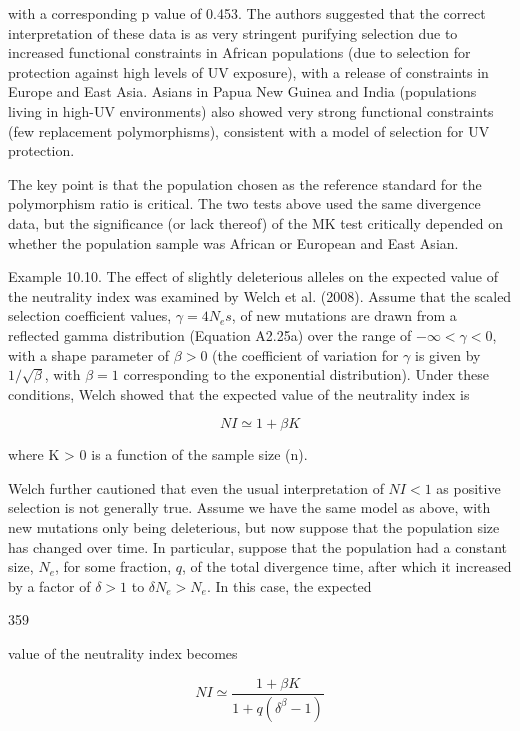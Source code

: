 \documentclass{article}
\begin{document}
with a corresponding p value of 0.453. The authors suggested that the correct interpretation of these data is as very stringent purifying selection due to increased functional constraints in African populations (due to selection for protection against high levels of UV exposure), with a release of constraints in Europe and East Asia. Asians in Papua New Guinea and India (populations living in high-UV environments) also showed very strong functional constraints (few replacement polymorphisms), consistent with a model of selection for UV protection.

The key point is that the population chosen as the reference standard for the polymorphism ratio is critical. The two tests above used the same divergence data, but the significance (or lack thereof) of the MK test critically depended on whether the population sample was African or European and East Asian.

Example 10.10. The effect of slightly deleterious alleles on the expected value of the neutrality index was examined by Welch et al. (2008). Assume that the scaled selection coefficient values,  $ \gamma = 4N_e s $, of new mutations are drawn from a reflected gamma distribution (Equation A2.25a) over the range of  $ -\infty < \gamma < 0 $, with a shape parameter of  $ \beta > 0 $ (the coefficient of variation for  $ \gamma $ is given by  $ 1/\sqrt{\beta} $, with  $ \beta = 1 $ corresponding to the exponential distribution). Under these conditions, Welch showed that the expected value of the neutrality index is

\begin{equation}
NI\simeq1+\beta K
\end{equation}

where K > 0 is a function of the sample size (n).

Welch further cautioned that even the usual interpretation of  $ NI < 1 $ as positive selection is not generally true. Assume we have the same model as above, with new mutations only being deleterious, but now suppose that the population size has changed over time. In particular, suppose that the population had a constant size,  $ N_e $, for some fraction,  $ q $, of the total divergence time, after which it increased by a factor of  $ \delta > 1 $ to  $ \delta N_e > N_e $. In this case, the expected

359

value of the neutrality index becomes

\begin{equation}
NI\simeq\frac{1+\beta K}{1+q(\delta^{\beta}-1)}
\end{equation}
\end{document}
